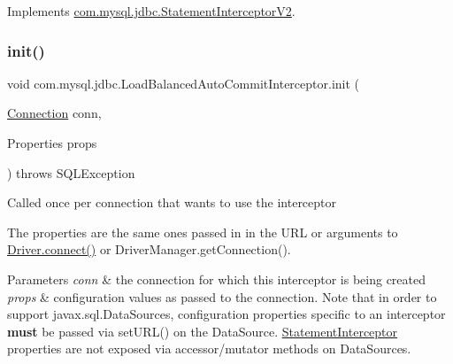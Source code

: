 Implements \mbox{\hyperlink{interfacecom_1_1mysql_1_1jdbc_1_1_statement_interceptor_v2_a36f03c5f5b1755d48549862d5b6c627f}{com.\+mysql.\+jdbc.\+Statement\+Interceptor\+V2}}.

\mbox{\label{classcom_1_1mysql_1_1jdbc_1_1_load_balanced_auto_commit_interceptor_a7ac3a68deb0ddbc6ede5ece0824d3189}} 
\subsubsection{\texorpdfstring{init()}{init()}}
{\footnotesize\ttfamily void com.\+mysql.\+jdbc.\+Load\+Balanced\+Auto\+Commit\+Interceptor.\+init (\begin{DoxyParamCaption}\item[{\mbox{\hyperlink{interfacecom_1_1mysql_1_1jdbc_1_1_connection}{Connection}}}]{conn,  }\item[{Properties}]{props }\end{DoxyParamCaption}) throws S\+Q\+L\+Exception}

Called once per connection that wants to use the interceptor

The properties are the same ones passed in in the U\+RL or arguments to \mbox{\hyperlink{classcom_1_1mysql_1_1jdbc_1_1_non_registering_driver_a834c012e752a01d1ee435b3461bb8218}{Driver.\+connect()}} or Driver\+Manager.\+get\+Connection().


\begin{DoxyParams}{Parameters}
{\em conn} & the connection for which this interceptor is being created \\
\hline
{\em props} & configuration values as passed to the connection. Note that in order to support javax.\+sql.\+Data\+Sources, configuration properties specific to an interceptor {\bfseries must} be passed via set\+U\+R\+L() on the Data\+Source. \mbox{\hyperlink{interfacecom_1_1mysql_1_1jdbc_1_1_statement_interceptor}{Statement\+Interceptor}} properties are not exposed via accessor/mutator methods on Data\+Sources.\\
\hline
\end{DoxyParams}

